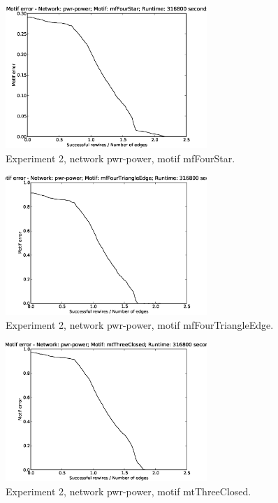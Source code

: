 \begin{figure}[p]
\centering
\includegraphics[width=3in]{Figures/motif_error-pwr-power-mfFourStar.eps}
\caption{Experiment 2, network pwr-power, motif mfFourStar.}
\label{fig:exp2-pwr-power-mfFourStar}
\end{figure}

\begin{figure}[p]
\centering
\includegraphics[width=3in]{Figures/motif_error-pwr-power-mfFourTriangleEdge.eps}
\caption{Experiment 2, network pwr-power, motif mfFourTriangleEdge.}
\label{fig:exp2-pwr-power-mfFourTriangleEdge}
\end{figure}

\begin{figure}[p]
\centering
\includegraphics[width=3in]{Figures/motif_error-pwr-power-mtThreeClosed.eps}
\caption{Experiment 2, network pwr-power, motif mtThreeClosed.}
\label{fig:exp2-pwr-power-mtThreeClosed}
\end{figure}

